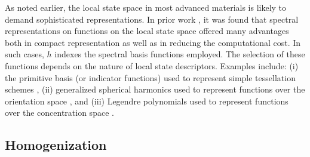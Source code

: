 \documentclass{bmcart}
\begin{document}
As noted earlier, the local state space in most advanced materials is
likely to demand sophisticated representations. In prior work
\cite{yabansu2014calibrated, yabansu2015representation,
brough2016microstructure}, it was found that spectral
representations on functions on the local state space offered many
advantages both in compact representation as well as in reducing the
computational cost. In such cases, $h$ indexes the spectral basis
functions employed. The selection of these functions depends on the
nature of local state descriptors. Examples include: (i) the primitive
basis (or indicator functions) used to represent simple tessellation
schemes \cite{landi2010multi, kalidindi2010novel, al2012multi,
kalidindi2011microstructure, gupta2015structure, cceccen2014data,
niezgoda2013novel, niezgoda2011understanding, cecen2016versatile},
(ii) generalized spherical harmonics used to represent functions over
the orientation space \cite{yabansu2014calibrated,
yabansu2015representation}, and (iii) Legendre polynomials used to
represent functions over the concentration space
\cite{brough2016microstructure}.

\subsection{Homogenization}
\end{document}
